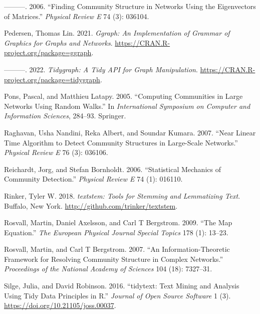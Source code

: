 \begin{CSLReferences}{1}{0}
\leavevmode{}%
---------. 2006. {``Finding Community Structure in Networks Using the Eigenvectors of Matrices.''} \emph{Physical Review E} 74 (3): 036104.

\leavevmode{}%
Pedersen, Thomas Lin. 2021. \emph{Ggraph: An Implementation of Grammar of Graphics for Graphs and Networks}. \url{https://CRAN.R-project.org/package=ggraph}.

\leavevmode{}%
---------. 2022. \emph{Tidygraph: A Tidy API for Graph Manipulation}. \url{https://CRAN.R-project.org/package=tidygraph}.

\leavevmode{}%
Pons, Pascal, and Matthieu Latapy. 2005. {``Computing Communities in Large Networks Using Random Walks.''} In \emph{International Symposium on Computer and Information Sciences}, 284--93. Springer.

\leavevmode{}%
Raghavan, Usha Nandini, Reka Albert, and Soundar Kumara. 2007. {``Near Linear Time Algorithm to Detect Community Structures in Large-Scale Networks.''} \emph{Physical Review E} 76 (3): 036106.

\leavevmode{}%
Reichardt, Jorg, and Stefan Bornholdt. 2006. {``Statistical Mechanics of Community Detection.''} \emph{Physical Review E} 74 (1): 016110.

\leavevmode{}%
Rinker, Tyler W. 2018. \emph{{textstem}: Tools for Stemming and Lemmatizing Text}. Buffalo, New York. \url{http://github.com/trinker/textstem}.

\leavevmode{}%
Rosvall, Martin, Daniel Axelsson, and Carl T Bergstrom. 2009. {``The Map Equation.''} \emph{The European Physical Journal Special Topics} 178 (1): 13--23.

\leavevmode{}%
Rosvall, Martin, and Carl T Bergstrom. 2007. {``An Information-Theoretic Framework for Resolving Community Structure in Complex Networks.''} \emph{Proceedings of the National Academy of Sciences} 104 (18): 7327--31.

\leavevmode{}%
Silge, Julia, and David Robinson. 2016. {``{tidytext: Text Mining and Analysis Using Tidy Data Principles in R}.''} \emph{Journal of Open Source Software} 1 (3). \url{https://doi.org/10.21105/joss.00037}.


\end{CSLReferences}
